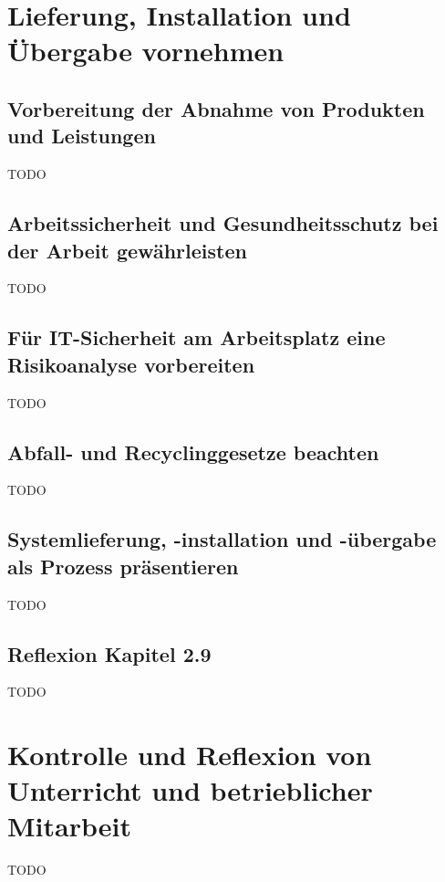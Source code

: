 \documentclass[11pt]{article}
\begin{document}
\newpage
\section{Lieferung, Installation und Übergabe vornehmen}
\subsection{Vorbereitung der Abnahme von Produkten und Leistungen}
    TODO
\subsection{Arbeitssicherheit und Gesundheitsschutz bei der Arbeit gewährleisten}
    TODO
\subsection{Für IT-Sicherheit am Arbeitsplatz eine Risikoanalyse vorbereiten}
    TODO
\subsection{Abfall- und Recyclinggesetze beachten}
    TODO
\subsection{Systemlieferung, -installation und -übergabe als Prozess präsentieren}
    TODO
\subsection*{Reflexion Kapitel 2.9}
    TODO

\newpage
\section{Kontrolle und Reflexion von Unterricht und betrieblicher Mitarbeit}
    TODO
\end{document}

